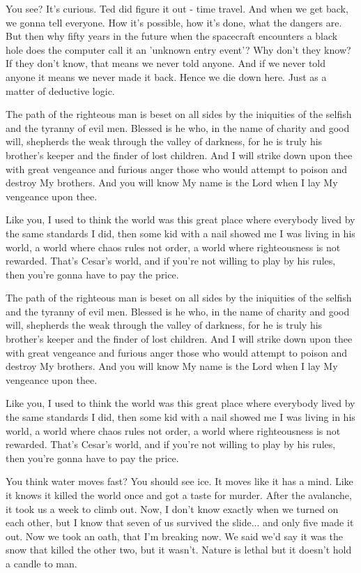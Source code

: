 \documentclass{book}
\begin{document}
You see? It's curious. Ted did figure it out - time travel. And when we get back, we gonna tell everyone. How it's possible, how it's done, what the dangers are. But then why fifty years in the future when the spacecraft encounters a black hole does the computer call it an 'unknown entry event'? Why don't they know? If they don't know, that means we never told anyone. And if we never told anyone it means we never made it back. Hence we die down here. Just as a matter of deductive logic.

The path of the righteous man is beset on all sides by the iniquities of the selfish and the tyranny of evil men. Blessed is he who, in the name of charity and good will, shepherds the weak through the valley of darkness, for he is truly his brother's keeper and the finder of lost children. And I will strike down upon thee with great vengeance and furious anger those who would attempt to poison and destroy My brothers. And you will know My name is the Lord when I lay My vengeance upon thee.

Like you, I used to think the world was this great place where everybody lived by the same standards I did, then some kid with a nail showed me I was living in his world, a world where chaos rules not order, a world where righteousness is not rewarded. That's Cesar's world, and if you're not willing to play by his rules, then you're gonna have to pay the price.

The path of the righteous man is beset on all sides by the iniquities of the selfish and the tyranny of evil men. Blessed is he who, in the name of charity and good will, shepherds the weak through the valley of darkness, for he is truly his brother's keeper and the finder of lost children. And I will strike down upon thee with great vengeance and furious anger those who would attempt to poison and destroy My brothers. And you will know My name is the Lord when I lay My vengeance upon thee.

Like you, I used to think the world was this great place where everybody lived by the same standards I did, then some kid with a nail showed me I was living in his world, a world where chaos rules not order, a world where righteousness is not rewarded. That's Cesar's world, and if you're not willing to play by his rules, then you're gonna have to pay the price.

You think water moves fast? You should see ice. It moves like it has a mind. Like it knows it killed the world once and got a taste for murder. After the avalanche, it took us a week to climb out. Now, I don't know exactly when we turned on each other, but I know that seven of us survived the slide... and only five made it out. Now we took an oath, that I'm breaking now. We said we'd say it was the snow that killed the other two, but it wasn't. Nature is lethal but it doesn't hold a candle to man.
\end{document}
